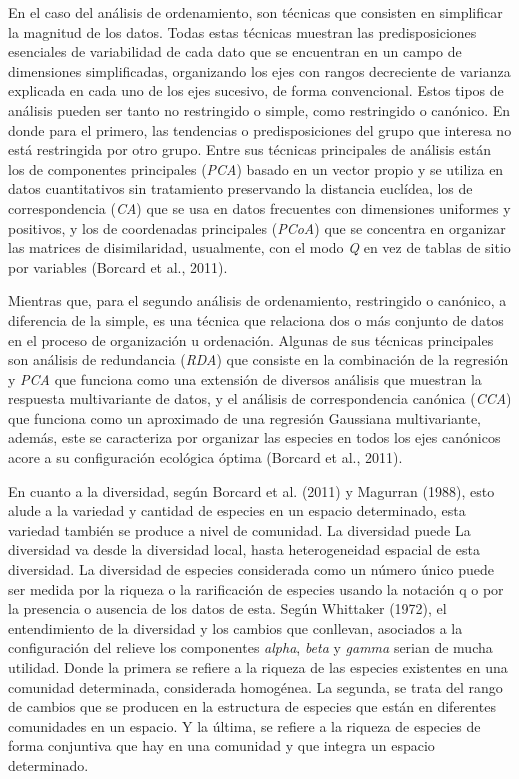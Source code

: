 \documentclass[11pt,]{article}
\begin{document}
En el caso del análisis de ordenamiento, son técnicas que consisten en
simplificar la magnitud de los datos. Todas estas técnicas muestran las
predisposiciones esenciales de variabilidad de cada dato que se
encuentran en un campo de dimensiones simplificadas, organizando los
ejes con rangos decreciente de varianza explicada en cada uno de los
ejes sucesivo, de forma convencional. Estos tipos de análisis pueden ser
tanto no restringido o simple, como restringido o canónico. En donde
para el primero, las tendencias o predisposiciones del grupo que
interesa no está restringida por otro grupo. Entre sus técnicas
principales de análisis están los de componentes principales
(\emph{PCA}) basado en un vector propio y se utiliza en datos
cuantitativos sin tratamiento preservando la distancia euclídea, los de
correspondencia (\emph{CA}) que se usa en datos frecuentes con
dimensiones uniformes y positivos, y los de coordenadas principales
(\emph{PCoA}) que se concentra en organizar las matrices de
disimilaridad, usualmente, con el modo \emph{Q} en vez de tablas de
sitio por variables (Borcard et al., 2011).

Mientras que, para el segundo análisis de ordenamiento, restringido o
canónico, a diferencia de la simple, es una técnica que relaciona dos o
más conjunto de datos en el proceso de organización u ordenación.
Algunas de sus técnicas principales son análisis de redundancia
(\emph{RDA}) que consiste en la combinación de la regresión y \emph{PCA}
que funciona como una extensión de diversos análisis que muestran la
respuesta multivariante de datos, y el análisis de correspondencia
canónica (\emph{CCA}) que funciona como un aproximado de una regresión
Gaussiana multivariante, además, este se caracteriza por organizar las
especies en todos los ejes canónicos acore a su configuración ecológica
óptima (Borcard et al., 2011).

En cuanto a la diversidad, según Borcard et al. (2011) y Magurran
(1988), esto alude a la variedad y cantidad de especies en un espacio
determinado, esta variedad también se produce a nivel de comunidad. La
diversidad puede La diversidad va desde la diversidad local, hasta
heterogeneidad espacial de esta diversidad. La diversidad de especies
considerada como un número único puede ser medida por la riqueza o la
rarificación de especies usando la notación q o por la presencia o
ausencia de los datos de esta. Según Whittaker (1972), el entendimiento
de la diversidad y los cambios que conllevan, asociados a la
configuración del relieve los componentes \emph{alpha}, \emph{beta} y
\emph{gamma} serian de mucha utilidad. Donde la primera se refiere a la
riqueza de las especies existentes en una comunidad determinada,
considerada homogénea. La segunda, se trata del rango de cambios que se
producen en la estructura de especies que están en diferentes
comunidades en un espacio. Y la última, se refiere a la riqueza de
especies de forma conjuntiva que hay en una comunidad y que integra un
espacio determinado.
\end{document}
